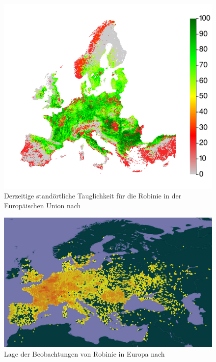 \documentclass[twocolumn]{scrartcl}
\begin{document}
\begin{figure}[htbp]
  \centering
  \includegraphics[width=.9\linewidth]{./bild/potentialEuropaAtlas}
  \caption{Derzeitige standörtliche Tauglichkeit für die Robinie in der Europäischen Union nach \cite{jrc2016treeAtlas}}
  \label{fig:verbreitungEuPot}
\end{figure}

\begin{figure}[htbp]
  \centering
  \includegraphics[width=.9\linewidth]{./bild/verbreitungRobEur}
  \caption{Lage der Beobachtungen von Robinie in Europa nach \cite{gbifRob}}
  \label{fig:verbreitungEur}
\end{figure}
\end{document}

